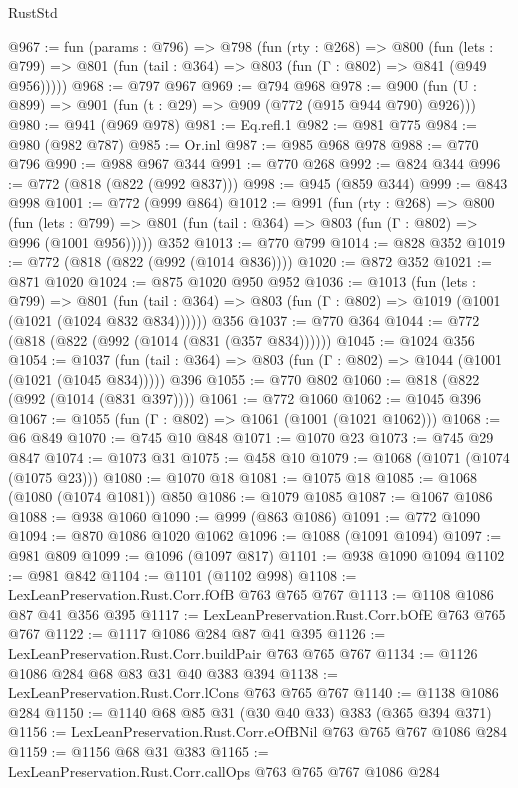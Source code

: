 \begin{lexlean}{RustStd}
\begin{coremodule}
@967 := fun (params : @796) =>
  @798
    (fun (rty : @268) =>
    @800
      (fun (lets : @799) => @801 (fun (tail : @364) => @803 (fun (Γ : @802) => @841 (@949 @956)))))
@968 := @797 @967
@969 := @794 @968
@978 := @900 (fun (U : @899) => @901 (fun (t : @29) => @909 (@772 (@915 @944 @790) @926)))
@980 := @941 (@969 @978)
@981 := Eq.refl.{1}
@982 := @981 @775
@984 := @980 (@982 @787)
@985 := Or.inl
@987 := @985 @968 @978
@988 := @770 @796
@990 := @988 @967 @344
@991 := @770 @268
@992 := @824 @344
@996 := @772 (@818 (@822 (@992 @837)))
@998 := @945 (@859 @344)
@999 := @843 @998
@1001 := @772 (@999 @864)
@1012 := @991
    (fun (rty : @268) =>
    @800
      (fun (lets : @799) => @801 (fun (tail : @364) => @803 (fun (Γ : @802) => @996 (@1001 @956)))))
    @352
@1013 := @770 @799
@1014 := @828 @352
@1019 := @772 (@818 (@822 (@992 (@1014 @836))))
@1020 := @872 @352
@1021 := @871 @1020
@1024 := @875 @1020 @950 @952
@1036 := @1013
    (fun (lets : @799) =>
    @801 (fun (tail : @364) => @803 (fun (Γ : @802) => @1019 (@1001 (@1021 (@1024 @832 @834))))))
    @356
@1037 := @770 @364
@1044 := @772 (@818 (@822 (@992 (@1014 (@831 (@357 @834))))))
@1045 := @1024 @356
@1054 := @1037
    (fun (tail : @364) => @803 (fun (Γ : @802) => @1044 (@1001 (@1021 (@1045 @834)))))
    @396
@1055 := @770 @802
@1060 := @818 (@822 (@992 (@1014 (@831 @397))))
@1061 := @772 @1060
@1062 := @1045 @396
@1067 := @1055 (fun (Γ : @802) => @1061 (@1001 (@1021 @1062)))
@1068 := @6 @849
@1070 := @745 @10 @848
@1071 := @1070 @23
@1073 := @745 @29 @847
@1074 := @1073 @31
@1075 := @458 @10
@1079 := @1068 (@1071 (@1074 (@1075 @23)))
@1080 := @1070 @18
@1081 := @1075 @18
@1085 := @1068 (@1080 (@1074 @1081)) @850
@1086 := @1079 @1085
@1087 := @1067 @1086
@1088 := @938 @1060
@1090 := @999 (@863 @1086)
@1091 := @772 @1090
@1094 := @870 @1086 @1020 @1062
@1096 := @1088 (@1091 @1094)
@1097 := @981 @809
@1099 := @1096 (@1097 @817)
@1101 := @938 @1090 @1094
@1102 := @981 @842
@1104 := @1101 (@1102 @998)
@1108 := LexLeanPreservation.Rust.Corr.fOfB @763 @765 @767
@1113 := @1108 @1086 @87 @41 @356 @395
@1117 := LexLeanPreservation.Rust.Corr.bOfE @763 @765 @767
@1122 := @1117 @1086 @284 @87 @41 @395
@1126 := LexLeanPreservation.Rust.Corr.buildPair @763 @765 @767
@1134 := @1126 @1086 @284 @68 @83 @31 @40 @383 @394
@1138 := LexLeanPreservation.Rust.Corr.lCons @763 @765 @767
@1140 := @1138 @1086 @284
@1150 := @1140 @68 @85 @31 (@30 @40 @33) @383 (@365 @394 @371)
@1156 := LexLeanPreservation.Rust.Corr.eOfBNil @763 @765 @767 @1086 @284
@1159 := @1156 @68 @31 @383
@1165 := LexLeanPreservation.Rust.Corr.callOps @763 @765 @767 @1086 @284

\end{coremodule}
\end{lexlean}
